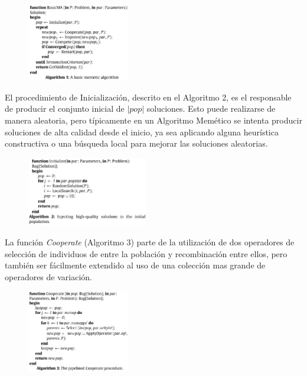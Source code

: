 \documentclass[10pt,journal,compsoc]{styles/IEEEtran}
\begin{document}
    \begin{figure}[H]
    \centering
    \includegraphics[width = 0.4\textwidth]{alg1.png}
    \caption{}
  	\end{figure}
  
El procedimiento de Inicialización, descrito en el Algoritmo 2, es el responsable de producir el conjunto inicial de $|pop|$ soluciones. Esto puede realizarse de manera aleatoria, pero típicamente en un Algoritmo Mem\'etico se intenta producir soluciones de alta calidad desde el inicio, ya sea aplicando alguna heurística constructiva o una búsqueda local para mejorar las soluciones aleatorias.\\

    \begin{figure}[H]
    \centering
    \includegraphics[width = 0.47\textwidth]{alg2.png}
    \caption{}
  	\end{figure}

La función \emph{Cooperate} (Algoritmo 3) parte de la utilización de dos operadores de selección de individuos de entre la población y recombinaci\'on entre ellos, pero también ser fácilmente extendido al uso de una colección mas grande de operadores de variación.\\

    \begin{figure}[H]
    \centering
    \includegraphics[width = 0.4\textwidth]{alg3.png}
    \caption{}
  	\end{figure}
\end{document}
